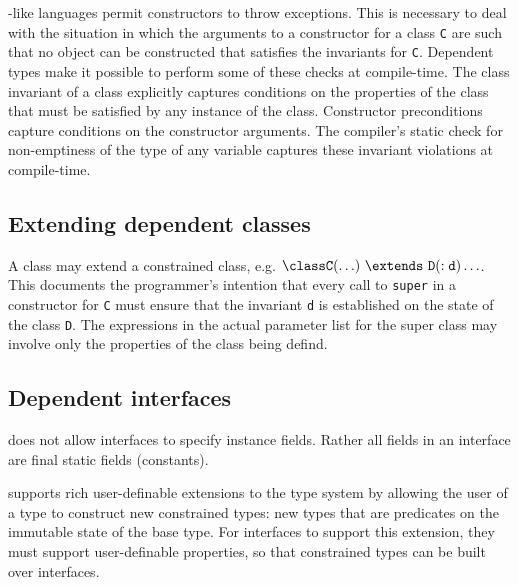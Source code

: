 \java{}-like languages permit constructors to throw exceptions. This
is necessary to deal with the situation in which the arguments to a
constructor for a class {\tt C} are such that no object can be
constructed that satisfies the invariants for {\tt C}. Dependent
types make it possible to perform some of these checks at
compile-time. The class invariant of a class explicitly captures
conditions on the properties of the class that must be satisfied by
any instance of the class.  Constructor preconditions capture
conditions on the constructor arguments.
The compiler's static check for
non-emptiness of the type of any variable captures these invariant
violations at compile-time.




\subsection{Extending dependent classes}

A class may extend a constrained class, e.g.{} ${\tt \class C(\ldots)\ 
\extends\ D(:d)\ldots}$. This documents the programmer's intention that
every call to {\tt super} in a constructor for {\tt C} must ensure
that the invariant {\tt d} is established on the state of the class
{\tt D}. The expressions in the actual parameter list for the super
class may involve only the properties of the class being defind.


\subsection{Dependent interfaces}

\java{} does not allow interfaces to specify instance fields. Rather all
fields in an interface are final static fields (constants).

\Xten{} supports rich user-definable extensions to the type system by
allowing the user of a type to construct new constrained types: new
types that are predicates on the immutable state of the base type.
For interfaces to support this extension, they must support
user-definable properties, so that constrained types can be
built over interfaces.

